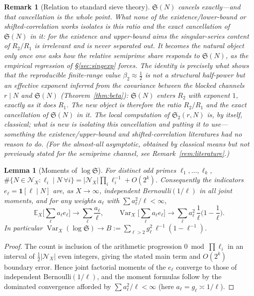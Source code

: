 \documentclass[]{interact}%
\newtheorem{remark}{Remark}
\newtheorem{lemma}{Lemma}
\newcommand{\sing}{\mathfrak S}
\newcommand{\Var}{\operatorname{Var}}
\begin{document}
\begin{remark}[Relation to standard sieve theory]
$\sing(N)$ cancels exactly---and that cancellation is the whole point. What none of the
existence/lower-bound or shifted-correlation works isolates is this ratio and the exact
cancellation of $\sing(N)$ in it: for the existence and
upper-bound aims the singular-series content of $R_2/R_1$ is irrelevant and is never separated
out. It becomes the natural object only once one asks how the relative semiprime
share responds to $\sing(N)$, as the empirical regression of \S\ref{sec:singexp} forces. The
identity is precisely what shows that the reproducible finite-range value
$\beta_2\approx\tfrac12$ is not a structural half-power but an effective exponent inferred from
the covariance between the blocked channels $r\mid N$ and $\sing(N)$ (Theorem~\ref{thm:beta}):
$\sing(N)$ enters $R_2$ with exponent $1$, exactly as it does $R_1$. The new object is therefore
the \emph{ratio} $R_2/R_1$ and the exact cancellation of $\sing(N)$ in it. The local computation
of $\sing_2(r,N)$ is, by itself, classical; what is new is isolating this cancellation and putting
it to use---something the existence/upper-bound and shifted-correlation literatures had no reason
to do. (For the almost-all asymptotic, obtained by classical means but not previously stated for
the semiprime channel, see Remark~\ref{rem:literature}.)
\end{remark}

\begin{lemma}[Moments of $\log\sing$]\label{lem:moments}
For distinct odd primes $\ell_1,\dots,\ell_k$,
$\#\{N\in\mathcal N_X:\ell_i\mid N\ \forall i\}=|\mathcal N_X|\prod_i\ell_i^{-1}+O(2^k)$.
Consequently the indicators $e_\ell=\mathbf 1[\ell\mid N]$ are, as $X\to\infty$,
independent Bernoulli$(1/\ell)$ in all joint moments, and for any weights $a_\ell$ with
$\sum a_\ell^2/\ell<\infty$,
\[
  \mathbb E_X\Big[\textstyle\sum_\ell a_\ell e_\ell\Big]\to\sum_\ell\frac{a_\ell}{\ell},
  \qquad
  \Var_X\Big[\textstyle\sum_\ell a_\ell e_\ell\Big]\to
  \sum_\ell a_\ell^2\,\frac1\ell\Big(1-\frac1\ell\Big).
\]
In particular $\Var_X(\log\sing)\to B:=\sum_{\ell>2}g_\ell^2\,\ell^{-1}(1-\ell^{-1})$.
\end{lemma}

\begin{proof}
The count is inclusion of the arithmetic progression $0\bmod\prod\ell_i$ in an
interval of $\tfrac12|\mathcal N_X|$ even integers, giving the stated main term and
$O(2^k)$ boundary error. Hence joint factorial moments of the $e_\ell$ converge to
those of independent Bernoulli$(1/\ell)$, and the moment formulas follow by the
dominated convergence afforded by $\sum a_\ell^2/\ell<\infty$ (here
$a_\ell=g_\ell\asymp1/\ell$).
\end{proof}
\end{document}
